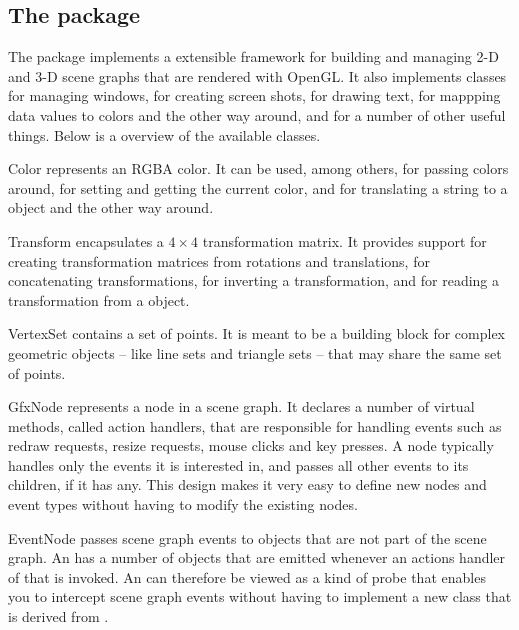 \documentclass[a4paper,10pt]{article}
\begin{document}
\subsection{The  package}

The  package implements a extensible framework for building and
managing 2-D and 3-D scene graphs that are rendered with OpenGL. It also
implements classes for managing windows, for creating screen shots, for
drawing text, for mappping data values to colors and the other way
around, and for a number of other useful things. Below is a overview of
the available classes.
\begin{Description}[\Code]

\item[Color] represents an RGBA color. It can be used, among others, for
  passing colors around, for setting and getting the current color, and
  for translating a string to a  object and the other way
  around.

\item[Transform] encapsulates a $4 \times 4$ transformation matrix. It
  provides support for creating transformation matrices from rotations
  and translations, for concatenating transformations, for inverting a
  transformation, and for reading a transformation from a
  \hyperref[class:Properties]{} object.

\item[VertexSet] contains a set of points. It is meant to be a building
  block for complex geometric objects -- like line sets and triangle sets
  -- that may share the same set of points.

\item[GfxNode] represents a node in a scene graph. It declares a number
  of virtual methods, called action handlers, that are responsible for
  handling events such as redraw requests, resize requests, mouse clicks
  and key presses. A node typically handles only the events it is
  interested in, and passes all other events to its children, if it has
  any. This design makes it very easy to define new nodes and event types
  without having to modify the existing nodes.

\item[EventNode] passes scene graph events to objects that are not part
  of the scene graph. An  has a number of
  \hyperref[class:Event]{} objects that are emitted whenever
  an actions handler of that  is invoked. An
   can therefore be viewed as a kind of probe that
  enables you to intercept scene graph events without having to implement
  a new class that is derived from .


\end{Description}
\end{document}
